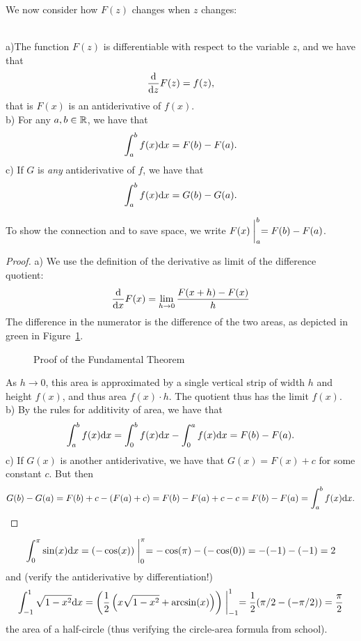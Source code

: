 We now consider how $F(z)$ changes when $z$ changes:
\begin{thm}\ \\
a)The function $F(z)$ is differentiable with respect to the variable $z$, and we
have that
\[
\frac{{\mbox{d}}}{{\mbox{d}}z} F(z)=f(z),
\]
that is $F(x)$ is an antiderivative of $f(x)$.\\
b) For any $a,b\in{\mathbb R}$, we have that
\[
\int_a^b f(x){\mbox{d}}x=F(b)-F(a).
\]
c) If $G$ is {\em any} antiderivative of $f$, we have that
\[
\int_a^b f(x){\mbox{d}}x=G(b)-G(a).
\]
\end{thm}
To show the connection and to save space, we write $\displaystyle
F(x)\biggm|_a^b=F(b)-F(a)$.
\begin{proof}
a) We use the definition of the derivative as limit of the difference quotient:
\[
\frac{{\mbox{d}}}{{\mbox{d}}x} F(x)=\lim_{h\to 0}\frac{F(x+h)-F(x)}{h}
\]
The difference in the numerator is the difference of the two areas, as depicted in
green in Figure~\ref{figfundthm}.
\begin{figure}
\begin{center}
\end{center}
\caption{Proof of the Fundamental Theorem}
\label{figfundthm}
\end{figure}
As $h\to 0$, this area is approximated by a single vertical strip of width $h$ and
height $f(x)$, and thus area $f(x)\cdot h$. The quotient thus has the limit
$f(x)$.\\
b) By the rules for additivity of area, we have that
\[
\int_a^b f(x){\mbox{d}}x=\int_0^b f(x){\mbox{d}}x-\int_0^a f(x){\mbox{d}}x=F(b)-F(a).
\]
c) If $G(x)$ is another antiderivative, we have that $G(x)=F(x)+c$ for some
constant $c$. But then
\[
G(b)-G(a)=F(b)+c-(F(a)+c)=F(b)-F(a)+c-c=F(b)-F(a)=\int_a^b f(x){\mbox{d}}x.
\]
\end{proof}
\begin{bsp}
\[
\int_0^\pi
\sin(x){\mbox{d}}x=(-\cos(x))\biggm|_0^\pi=-\cos(\pi)-(-\cos(0))=-(-1)-(-1)=2
\]
and (verify the antiderivative by differentiation!)
\[
\int_{-1}^1\sqrt{1-x^2}{\mbox{d}}x=\left(\frac12\left(x\sqrt{1-x^2}+\arcsin(x)\right)\right)
\biggm|_{-1}^1=\frac12(\pi/2-(-\pi/2))=\frac{\pi}{2}
\]
the area of a half-circle (thus verifying the circle-area formula from school).
\end{bsp}

